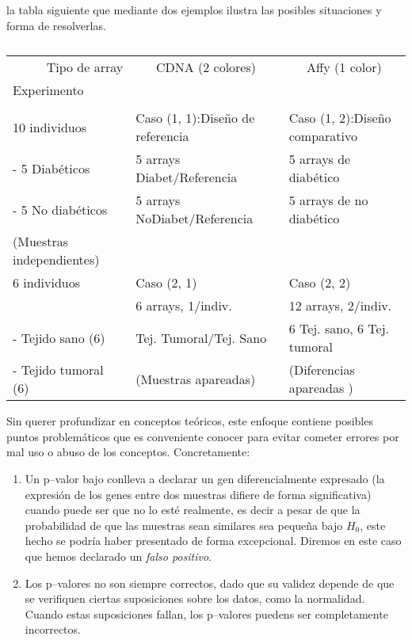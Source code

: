 la tabla siguiente que mediante dos ejemplos ilustra las posibles situaciones y forma de resolverlas.


\begin{table}[htbp]
\caption{}
\begin{tabular}{|l|l|l|}
\hline
\multicolumn{1}{|r|}{Tipo de array} & \multicolumn{ 1}{c|}{CDNA  (2 colores)} & \multicolumn{ 1}{c|}{Affy (1 color)} \\ \cline{ 1- 1}
Experimento                       & \multicolumn{ 1}{c|}{} & \multicolumn{ 1}{c|}{} \\ \hline
 &  &  \\
10 individuos & Caso (1, 1):Dise\~no de referencia & Caso (1, 2):Dise\~no comparativo \\
- 5 Diab\'eticos  & 5 arrays Diabet/Referencia & 5 arrays  de diab\'etico \\
- 5 No diab\'eticos   & 5 arrays NoDiabet/Referencia & 5 arrays  de no diab\'etico \\
 (Muestras independientes) &  & \\ \hline
6 individuos & Caso (2, 1) & Caso (2, 2) \\
 & 6 arrays, 1/indiv. & 12 arrays, 2/indiv. \\
- Tejido sano (6)  & Tej. Tumoral/Tej. Sano & 6 Tej. sano, 6 Tej. tumoral \\
- Tejido tumoral  (6) & (Muestras apareadas)  & (Diferencias apareadas ) \\ \hline
\end{tabular}
\label{}
\end{table}

Sin querer profundizar en conceptos te\'oricos, este enfoque contiene posibles puntos problem\'aticos que es
conveniente conocer para evitar cometer errores por mal uso o abuso de los conceptos. Concretamente:
\begin{enumerate}
\item Un p--valor bajo  conlleva a  declarar un gen diferencialmente expresado (la expresi\'on de los genes entre dos muestras difiere de forma significativa) cuando puede ser que no lo est\'e realmente, es decir a pesar de que la probabilidad de que las muestras sean similares sea peque\~na bajo $H_0$, este hecho se podr\'ia haber presentado de forma excepcional. Diremos en este caso que hemos declarado un  \emph{falso positivo}.
\item Los p--valores no son siempre correctos, dado que su validez depende de que se verifiquen ciertas suposiciones sobre los
datos, como la normalidad. Cuando estas suposiciones fallan, los p--valores puedens ser completamente incorrectos.
\end{enumerate}

